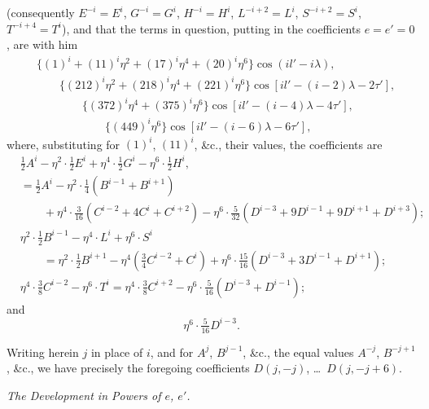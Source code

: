 \documentclass[11pt,a4paper]{article}
\theoremstyle{plain}
\theoremstyle{definition}
\theoremstyle{remark}
\begin{document}
(consequently $E^{-i}=E^{i}$, $G^{-i}=G^{i}$, $H^{-i}=H^{i}$, $L^{-i+2}=L^{i}$, $S^{-i+2}=S^{i}$, $T^{-i+4}=T^{i}$), and that the terms in question, putting in the coefficients $e=e'=0$, are with him
\begin{align*}
&\{(1)^{i}+(11)^{i}\eta^{2}+(17)^{i}\eta^{4}+(20)^{i}\eta^{6}\}\cos(il'-i\lambda),\\
&\qquad\{(212)^{i}\eta^{2}+(218)^{i}\eta^{4}+(221)^{i}\eta^{6}\}\cos[il'-(i-2)\lambda-2\tau'],\\
&\qquad\qquad\{(372)^{i}\eta^{4}+(375)^{i}\eta^{6}\}\cos[il'-(i-4)\lambda-4\tau'],\\
&\qquad\qquad\qquad\{(449)^{i}\eta^{6}\}\cos[il'-(i-6)\lambda-6\tau'],
\end{align*}
where, substituting for $(1)^{i}$, $(11)^{i}$, \&c., their values, the coefficients are
\begin{align*}
&\tfrac12 A^{i} - \eta^{2}\cdot\tfrac12 E^{i} + \eta^{4}\cdot\tfrac12 G^{i} - \eta^{6}\cdot\tfrac12 H^{i},\\
&= \tfrac12 A^{i} - \eta^{2}\cdot\tfrac14(B^{i-1}+B^{i+1})\\
&\qquad + \eta^{4}\cdot\tfrac{3}{16}(C^{i-2}+4C^{i}+C^{i+2}) - \eta^{6}\cdot\tfrac{5}{32}(D^{i-3}+9D^{i-1}+9D^{i+1}+D^{i+3});\\
&\eta^{2}\cdot\tfrac12 B^{i-1} - \eta^{4}\cdot L^{i} + \eta^{6}\cdot S^{i}\\
&\qquad = \eta^{2}\cdot\tfrac12 B^{i+1} - \eta^{4}(\tfrac34 C^{i-2}+C^{i}) + \eta^{6}\cdot\tfrac{15}{16}(D^{i-3}+3D^{i-1}+D^{i+1});\\
&\eta^{4}\cdot\tfrac38 C^{i-2} - \eta^{6}\cdot T^{i} = \eta^{4}\cdot\tfrac38 C^{i+2} - \eta^{6}\cdot\tfrac{5}{16}(D^{i-3}+D^{i-1});
\end{align*}
and
\[
\eta^{6}\cdot\tfrac{5}{16}D^{i-3}.
\]

Writing herein $j$ in place of $i$, and for $A^{j}$, $B^{j-1}$, \&c., the equal values $A^{-j}$, $B^{-j+1}$, \&c., we have precisely the foregoing coefficients $D(j,-j)$, \dots\ $D(j,-j+6)$.

\bigskip

\begin{center}
\textit{The Development in Powers of $e$, $e'$.}
\end{center}
\end{document}
